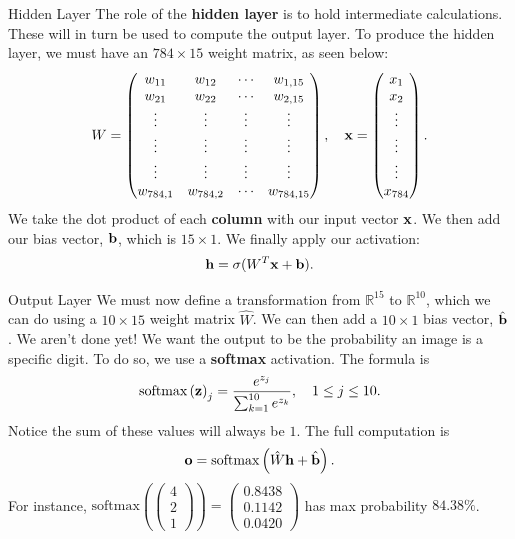 \documentclass[xcolor=dvipsnames, fontsize=11pt, %
pagesize, %
parskip=half-, t]{beamer}
\begin{document}
\begin{frame}{Hidden Layer}
The role of the \textbf{hidden layer} is to hold intermediate calculations. These will in turn be used to compute the output layer. To produce the hidden layer, we must have an $784\times 15$ weight matrix, as seen below: $$W=\begin{pmatrix} w_{11} & w_{12} & \cdots & w_{1,15} \\  w_{21} & w_{22} & \cdots & w_{2,15} \\ \vdots & \vdots & \vdots & \vdots \\ \vdots & \vdots & \vdots & \vdots \\ \vdots & \vdots & \vdots & \vdots \\  w_{784, 1} & w_{784, 2} & \cdots & w_{784, 15} \end{pmatrix}, \quad \bold{x}=\begin{pmatrix} x_1 \\ x_2 \\ \vdots \\ \vdots \\ \vdots \\ x_{784} \end{pmatrix}.$$
We take the dot product of each \textbf{column} with our input vector $\bold{x}$. We then add our bias vector, $\bold{b}$, which is $15\times 1$. We finally apply our activation: $$\bold{h}=\sigma(W^{T}\bold{x}+\bold{b}).$$
\end{frame}
\begin{frame}{Output Layer}
We must now define a transformation from $\mathbb{R}^{15}$ to $\mathbb{R}^{10}$, which we can do using a $10\times 15$ weight matrix $\hat{W}$. We can then add a $10\times 1$ bias vector, $\hat{\bold{b}}$. \pause We aren't done yet! We want the output to be the probability an image is a specific digit. To do so, we use a \textbf{softmax} activation. \pause The formula is $$\displaystyle \text{softmax}\left(\bold{z}\right)_{j}=\frac{e^{z_j}}{\sum_{k=1}^{10}e^{z_k}}, \quad 1\le j \le 10.$$ \pause Notice the sum of these values will always be $1$. \pause The full computation is $$\bold{o}=\text{softmax}\left(\hat{W}\bold{h}+\hat{\bold{b}}\right).$$  \pause
 For instance, $\text{softmax}(\begin{pmatrix} 4 \\ 2 \\ 1   \end{pmatrix})=\begin{pmatrix} 0.8438 \\ 0.1142 \\ 0.0420 \end{pmatrix}$ has max probability $84.38\%$.
  \end{frame}
\end{document}
